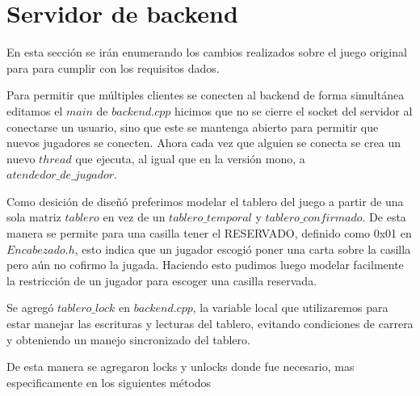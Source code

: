 \section{Servidor de backend}

En esta sección se irán enumerando los cambios realizados sobre el juego original para para cumplir con los requisitos dados.

Para permitir que múltiples clientes se conecten al backend de forma simultánea editamos el $main$ de $backend.cpp$ hicimos que no se cierre el socket del servidor al conectarse un usuario, sino que este se mantenga abierto para permitir que nuevos jugadores se conecten. Ahora cada vez que alguien se conecta se crea un nuevo $thread$ que ejecuta, al igual que en la versión mono, a $atendedor\_de\_jugador$.

Como desición de diseñó preferimos modelar el tablero del juego a partir de una sola matriz $tablero$ en vez de un $tablero\_temporal$ y $tablero\_confirmado$. De esta manera se permite para una casilla tener el RESERVADO, definido como 0x01 en $Encabezado.h$, esto indica que un jugador escogió poner una carta sobre la casilla pero aún no cofirmo la jugada. Haciendo esto pudimos luego modelar facilmente la restricción de un jugador para escoger una casilla reservada.




Se agregó $tablero\_lock$ en $backend.cpp$, la variable local que utilizaremos para estar manejar las escrituras y lecturas del tablero, evitando condiciones de carrera y obteniendo un manejo sincronizado del tablero.

De esta manera se agregaron locks y unlocks donde fue necesario, mas especificamente en los siguientes métodos

